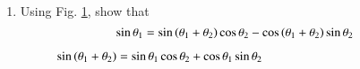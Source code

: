 %
%
\renewcommand{\theequation}{\theenumi}
\begin{enumerate}[label=\arabic*.,ref=\thesubsection.\theenumi]
%
%
\item
	Using Fig. \ref{trig_id_sin_theta}, show that 
\begin{equation}
\label{trig_id_sin_theta_eq}
\sin  \theta_1 = \sin \left(\theta_1 + \theta_2\right)\cos \theta_2 - \cos\left(\theta_1+\theta_2\right)\sin\theta_2
\end{equation}	

\begin{figure}[!ht]
	\begin{center}
		
		\resizebox{\columnwidth}{!}{}
	\end{center}
	\caption{$\sin \left(\theta_1+\theta_2\right) = \sin\theta_1\cos\theta_2 + \cos\theta_1\sin\theta_2$}
	\label{trig_id_sin_theta}	
\end{figure}
%


\end{enumerate}
